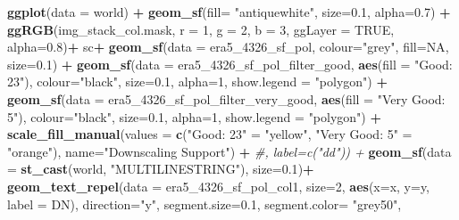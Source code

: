 \documentclass[12pt,oneside]{reedthesis}
\newenvironment{Shaded}{\begin{snugshade}}{\end{snugshade}}
\newcommand{\CommentTok}[1]{\textcolor[rgb]{0.56,0.35,0.01}{\textit{#1}}}
\newcommand{\DataTypeTok}[1]{\textcolor[rgb]{0.13,0.29,0.53}{#1}}
\newcommand{\DecValTok}[1]{\textcolor[rgb]{0.00,0.00,0.81}{#1}}
\newcommand{\FloatTok}[1]{\textcolor[rgb]{0.00,0.00,0.81}{#1}}
\newcommand{\KeywordTok}[1]{\textcolor[rgb]{0.13,0.29,0.53}{\textbf{#1}}}
\newcommand{\NormalTok}[1]{#1}
\newcommand{\OperatorTok}[1]{\textcolor[rgb]{0.81,0.36,0.00}{\textbf{#1}}}
\newcommand{\OtherTok}[1]{\textcolor[rgb]{0.56,0.35,0.01}{#1}}
\newcommand{\StringTok}[1]{\textcolor[rgb]{0.31,0.60,0.02}{#1}}
\begin{document}
\begin{Shaded}
\begin{Highlighting}[]
{{{{\KeywordTok{ggplot}\NormalTok{(}\DataTypeTok{data =}\NormalTok{ world) }\OperatorTok{+}\StringTok{ }
\StringTok{  }\KeywordTok{geom_sf}\NormalTok{(}\DataTypeTok{fill=} \StringTok{"antiquewhite"}\NormalTok{,  }\DataTypeTok{size=}\FloatTok{0.1}\NormalTok{, }\DataTypeTok{alpha=}\FloatTok{0.7}\NormalTok{) }\OperatorTok{+}\StringTok{ }
\StringTok{  }\KeywordTok{ggRGB}\NormalTok{(img_stack_col.mask, }\DataTypeTok{r =} \DecValTok{1}\NormalTok{, }\DataTypeTok{g =} \DecValTok{2}\NormalTok{, }\DataTypeTok{b =} \DecValTok{3}\NormalTok{, }\DataTypeTok{ggLayer =} \OtherTok{TRUE}\NormalTok{, }\DataTypeTok{alpha=}\FloatTok{0.8}\NormalTok{)}\OperatorTok{+}
\StringTok{  }\NormalTok{sc}\OperatorTok{+}
\StringTok{  }\KeywordTok{geom_sf}\NormalTok{(}\DataTypeTok{data =}\NormalTok{ era5_}\DecValTok{4326}\NormalTok{_sf_pol, }\DataTypeTok{colour=}\StringTok{"grey"}\NormalTok{, }\DataTypeTok{fill=}\OtherTok{NA}\NormalTok{, }\DataTypeTok{size=}\FloatTok{0.1}\NormalTok{) }\OperatorTok{+}\StringTok{ }
\StringTok{  }\KeywordTok{geom_sf}\NormalTok{(}\DataTypeTok{data =}\NormalTok{ era5_}\DecValTok{4326}\NormalTok{_sf_pol_filter_good, }\KeywordTok{aes}\NormalTok{(}\DataTypeTok{fill =} \StringTok{"Good: 23"}\NormalTok{), }\DataTypeTok{colour=}\StringTok{"black"}\NormalTok{, }\DataTypeTok{size=}\FloatTok{0.1}\NormalTok{, }\DataTypeTok{alpha=}\DecValTok{1}\NormalTok{, }\DataTypeTok{show.legend =} \StringTok{"polygon"}\NormalTok{) }\OperatorTok{+}
\StringTok{  }\KeywordTok{geom_sf}\NormalTok{(}\DataTypeTok{data =}\NormalTok{ era5_}\DecValTok{4326}\NormalTok{_sf_pol_filter_very_good, }\KeywordTok{aes}\NormalTok{(}\DataTypeTok{fill =} \StringTok{"Very Good: 5"}\NormalTok{), }\DataTypeTok{colour=}\StringTok{"black"}\NormalTok{, }\DataTypeTok{size=}\FloatTok{0.1}\NormalTok{, }\DataTypeTok{alpha=}\DecValTok{1}\NormalTok{, }\DataTypeTok{show.legend =} \StringTok{"polygon"}\NormalTok{) }\OperatorTok{+}
\StringTok{  }\KeywordTok{scale_fill_manual}\NormalTok{(}\DataTypeTok{values =} \KeywordTok{c}\NormalTok{(}\StringTok{"Good: 23"}\NormalTok{ =}\StringTok{ "yellow"}\NormalTok{, }\StringTok{"Very Good: 5"}\NormalTok{ =}\StringTok{ "orange"}\NormalTok{), }\DataTypeTok{name=}\StringTok{"Downscaling Support"}\NormalTok{) }\OperatorTok{+}\StringTok{ }\CommentTok{#, label=c("dd")) +  }
\StringTok{  }\KeywordTok{geom_sf}\NormalTok{(}\DataTypeTok{data =} \KeywordTok{st_cast}\NormalTok{(world, }\StringTok{"MULTILINESTRING"}\NormalTok{), }\DataTypeTok{size=}\FloatTok{0.1}\NormalTok{)}\OperatorTok{+}
\StringTok{  }\KeywordTok{geom_text_repel}\NormalTok{(}\DataTypeTok{data =}\NormalTok{ era5_}\DecValTok{4326}\NormalTok{_sf_pol_col1, }\DataTypeTok{size=}\DecValTok{2}\NormalTok{, }\KeywordTok{aes}\NormalTok{(}\DataTypeTok{x=}\NormalTok{x, }\DataTypeTok{y=}\NormalTok{y, }\DataTypeTok{label =}\NormalTok{ DN), }\DataTypeTok{direction=}\StringTok{"y"}\NormalTok{, }\DataTypeTok{segment.size=}\FloatTok{0.1}\NormalTok{, }\DataTypeTok{segment.color=} \StringTok{"grey50"}\NormalTok{, }
}}}}
\end{Highlighting}
\end{Shaded}
\end{document}
